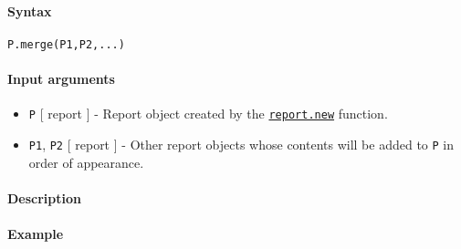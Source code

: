 


	\paragraph{Syntax}\label{syntax}

\begin{verbatim}
P.merge(P1,P2,...)
\end{verbatim}

\paragraph{Input arguments}\label{input-arguments}

\begin{itemize}
\item
  \texttt{P} {[} report {]} - Report object created by the
  \href{report/new}{\texttt{report.new}} function.
\item
  \texttt{P1}, \texttt{P2} {[} report {]} - Other report objects whose
  contents will be added to \texttt{P} in order of appearance.
\end{itemize}

\paragraph{Description}\label{description}

\paragraph{Example}\label{example}


